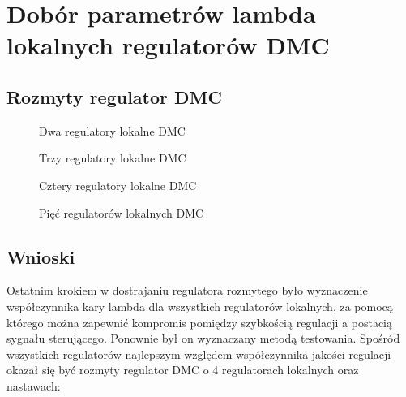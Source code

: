 \section{Dobór parametrów lambda lokalnych regulatorów DMC}
\label{projekt:zad7}

\subsection{Rozmyty regulator DMC}
\label{projekt:zad7:PID}

\begin{figure}[H] 
   \centering
   
   \caption{Dwa regulatory lokalne DMC}
   \label{projekt:zad7:DMC:2:figure}
\end{figure}

\begin{figure}[H] 
   \centering
   
   \caption{Trzy regulatory lokalne DMC}
   \label{projekt:zad7:DMC:3:figure}
\end{figure}

\begin{figure}[H] 
   \centering
   
   \caption{Cztery regulatory lokalne DMC}
   \label{projekt:zad7:DMC:4:figure}
\end{figure}

\begin{figure}[H] 
   \centering
   
   \caption{Pięć regulatorów lokalnych DMC}
   \label{projekt:zad7:DMC:5:figure}
\end{figure}

\subsection{Wnioski}
Ostatnim krokiem w dostrajaniu regulatora rozmytego było
wyznaczenie współczynnika kary lambda dla wszystkich regulatorów
lokalnych, za pomocą którego można zapewnić kompromis pomiędzy
szybkością regulacji a postacią sygnału sterującego. Ponownie był on
wyznaczany metodą testowania. Spośród wszystkich regulatorów
najlepszym względem współczynnika jakości regulacji okazał się być
rozmyty regulator DMC o 4 regulatorach lokalnych oraz nastawach:


\newpage
